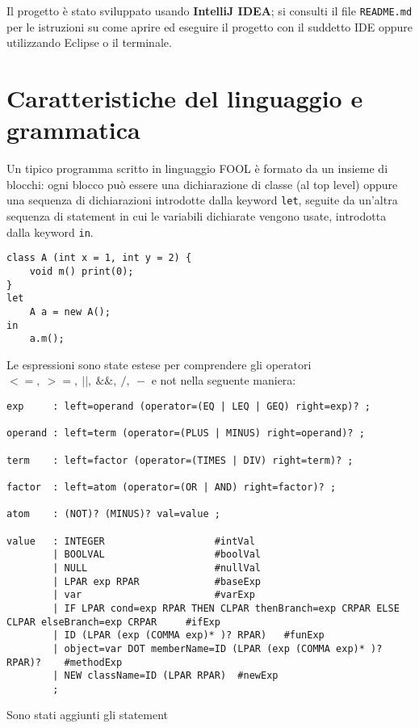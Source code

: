 \documentclass[a4paper]{article}   %
\begin{document}
Il progetto è stato sviluppato usando \textbf{IntelliJ IDEA}; si consulti il file \lstinline|README.md| per le istruzioni su come aprire ed eseguire il progetto con il suddetto IDE oppure utilizzando Eclipse o il terminale.

\section{Caratteristiche del linguaggio e grammatica}

Un tipico programma scritto in linguaggio FOOL è formato da un insieme di blocchi: ogni blocco può essere una dichiarazione di classe (al top level) oppure una sequenza di dichiarazioni introdotte dalla keyword \lstinline[language=ANTLR]|let|, seguite da un'altra sequenza di statement in cui le variabili dichiarate vengono usate, introdotta dalla keyword \lstinline[language=ANTLR]|in|.\\

\begin{lstlisting}[basicstyle=\footnotesize\ttfamily]
class A (int x = 1, int y = 2) {
	void m() print(0);
}
let
	A a = new A();
in
	a.m();
\end{lstlisting}
Le espressioni sono state estese per comprendere gli operatori $<=,\ >=,\ ||,\ \&\&,\ /,\ - $
   e not nella seguente maniera:\\

\begin{lstlisting}[language=ANTLR,basicstyle=\footnotesize\ttfamily]
exp		: left=operand (operator=(EQ | LEQ | GEQ) right=exp)? ;

operand	: left=term (operator=(PLUS | MINUS) right=operand)? ;

term	: left=factor (operator=(TIMES | DIV) right=term)? ;

factor	: left=atom (operator=(OR | AND) right=factor)? ;

atom	: (NOT)? (MINUS)? val=value ;

value	: INTEGER					#intVal
		| BOOLVAL					#boolVal
		| NULL						#nullVal
		| LPAR exp RPAR				#baseExp
		| var     					#varExp
		| IF LPAR cond=exp RPAR THEN CLPAR thenBranch=exp CRPAR ELSE CLPAR elseBranch=exp CRPAR  	#ifExp
		| ID (LPAR (exp (COMMA exp)* )? RPAR)	#funExp
		| object=var DOT memberName=ID (LPAR (exp (COMMA exp)* )? RPAR)?	#methodExp
		| NEW className=ID (LPAR RPAR)	#newExp
		;
\end{lstlisting}

Sono stati aggiunti gli statement\\
\end{document}
